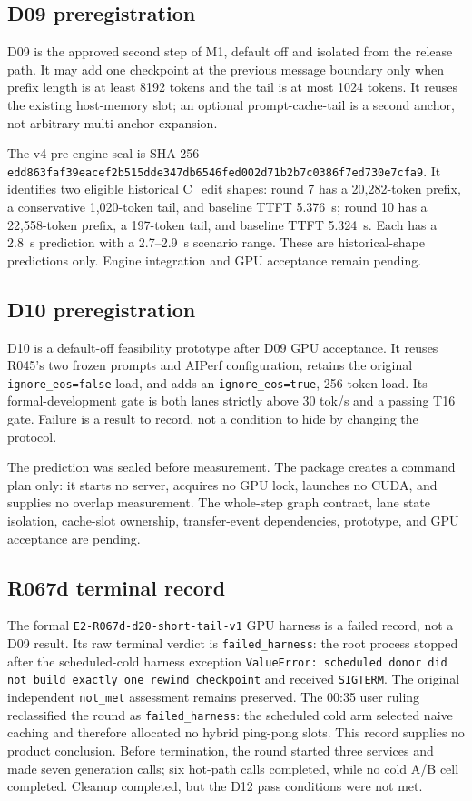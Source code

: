 \documentclass[11pt]{article}
\begin{document}
\subsection{D09 preregistration}

D09 is the approved second step of M1, default off and isolated from the release path. It may add one checkpoint at the previous message boundary only when prefix length is at least 8192 tokens and the tail is at most 1024 tokens. It reuses the existing host-memory slot; an optional prompt-cache-tail is a second anchor, not arbitrary multi-anchor expansion.

The v4 pre-engine seal is SHA-256 \texttt{edd863faf39eacef2b515dde347db6546fed002d71b2b7c0386f7ed730e7cfa9}. It identifies two eligible historical C\_edit shapes: round 7 has a 20,282-token prefix, a conservative 1,020-token tail, and baseline TTFT 5.376~s; round 10 has a 22,558-token prefix, a 197-token tail, and baseline TTFT 5.324~s. Each has a 2.8~s prediction with a 2.7--2.9~s scenario range. These are historical-shape predictions only. Engine integration and GPU acceptance remain pending.

\subsection{D10 preregistration}

D10 is a default-off feasibility prototype after D09 GPU acceptance. It reuses R045's two frozen prompts and AIPerf configuration, retains the original \texttt{ignore\_eos=false} load, and adds an \texttt{ignore\_eos=true}, 256-token load. Its formal-development gate is both lanes strictly above 30 tok/s and a passing T16 gate. Failure is a result to record, not a condition to hide by changing the protocol.

The prediction was sealed before measurement. The package creates a command plan only: it starts no server, acquires no GPU lock, launches no CUDA, and supplies no overlap measurement. The whole-step graph contract, lane state isolation, cache-slot ownership, transfer-event dependencies, prototype, and GPU acceptance are pending.

\subsection{R067d terminal record}
\label{sec:r067d}

The formal \texttt{E2-R067d-d20-short-tail-v1} GPU harness is a failed record, not a D09 result. Its raw terminal verdict is \texttt{failed\_harness}: the root process stopped after the scheduled-cold harness exception \texttt{ValueError: scheduled donor did not build exactly one rewind checkpoint} and received \texttt{SIGTERM}. The original independent \texttt{not\_met} assessment remains preserved. The 00:35 user ruling reclassified the round as \texttt{failed\_harness}: the scheduled cold arm selected naive caching and therefore allocated no hybrid ping-pong slots. This record supplies no product conclusion. Before termination, the round started three services and made seven generation calls; six hot-path calls completed, while no cold A/B cell completed. Cleanup completed, but the D12 pass conditions were not met.
\end{document}
